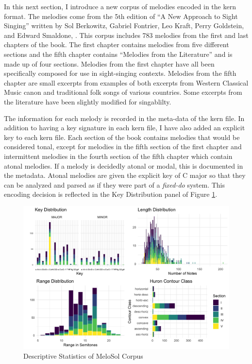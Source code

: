 \documentclass[12pt,]{book}
\begin{document}
In this next section, I introduce a new corpus of melodies encoded in the kern format.
The melodies come from the 5th edition of ``A New Approach to Sight Singing'' written by Sol Berkowitz, Gabriel Fontrier, Leo Kraft, Perry Goldstein, and Edward Smaldone, \citep{berkowitzNewApproachSight2011}.
This corpus includes 783 melodies from the first and last chapters of the book.
The first chapter contains melodies from five different sections and the fifth chapter contains ``Melodies from the Literature'' and is made up of four sections.
Melodies from the first chapter have all been specifically composed for use in sight-singing contexts.
Melodies from the fifth chapter are small excerpts from examples of both excerpts from Western Classical Music canon and traditional folk songs of various countries.
Some excerpts from the literature have been slightly modified for singablilty.

The information for each melody is recorded in the meta-data of the kern file.
In addition to having a key signature in each kern file, I have also added an explicit key to each kern file.
Each section of the book contains melodies that would be considered tonal, except for melodies in the fifth section of the first chapter and intermittent melodies in the fourth section of the fifth chapter which contain atonal melodies.
If a melody is decidedly atonal or modal, this is documented in the metadata.
Atonal melodies are given the explicit key of C major so that they can be analyzed and parsed as if they were part of a \emph{fixed-do} system.
This encoding decision is reflected in the Key Distribution panel of Figure \ref{fig:melosoldescriptivepanel}.

\begin{figure}

{\centering \includegraphics[width=1\linewidth]{img/melosoldescriptpanel} 

}

\caption{Descriptive Statistics of MeloSol Corpus}\label{fig:melosoldescriptivepanel}
\end{figure}
\end{document}
